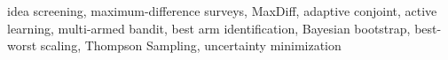 \documentclass[nonblindrev]{informs3}
\begin{document}


\KEYWORDS
{idea screening, maximum-difference surveys, MaxDiff, adaptive conjoint, active learning, multi-armed bandit, best arm identification, Bayesian bootstrap, best-worst scaling, Thompson Sampling, uncertainty minimization}




\maketitle



\end{document}
